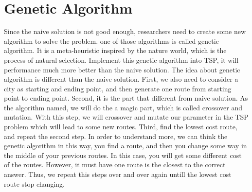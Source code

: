 \documentclass[a4paper,man,natbib]{apa6}
\begin{document}
\section{Genetic Algorithm}
Since the naive solution is not good enough, researchers need to create some new algorithm to solve the problem. one of those algorithms is called genetic algorithm. It is a meta-heuristic inspired by the nature world, which is the process of natural selection. Implement this genetic algorithm into TSP, it will performance much more better than the naive solution. The idea about genetic algorithm is different than the naive solution. First, we also need to consider a city as starting and ending point, and then generate one route from starting point to ending point. Second, it is the part that different from naive solution. As the algorithm named, we will do the a magic part, which is called crossover and mutation. With this step, we will crossover and mutate our parameter in the TSP problem which will lead to some new routes. Third, find the lowest cost route, and repeat the second step. In order to understand more, we can think the genetic algorithm in this way, you find a route, and then you change some way in the middle of your previous routes. In this case, you will get some different cost of the routes. However, it must have one route is the closest to the correct answer. Thus, we repeat this steps over and over again untill the lowest cost route stop changing. 
\end{document}
